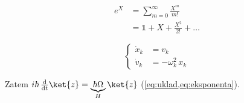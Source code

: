 \documentclass[a4paper, polish, 11pt]{scrartcl}
\begin{document}
\begin{equation}
	\begin{aligned}
		e^X &= \sum_{m=0}^{\infty} \frac{X^m}{m!} \\
		&= \mathds{1} + X + \frac{X^2}{2!} + \ldots
	\end{aligned}
	\label{eq:eksponenta}
\end{equation}

\begin{equation}
	\left\{
	\begin{aligned}
		\dot{x}_k &= v_k \\
		\dot{v}_k &= -\omega_k^2\,x_k
	\end{aligned}
	\right.
	\label{eq:uklad}
\end{equation}

Zatem $i\hbar\,\odv{}{t}\ket{z} = \underbrace{\hbar\Omega}_{H}\ket{z}$ (\cref{eq:uklad,eq:eksponenta}).
\end{document}
